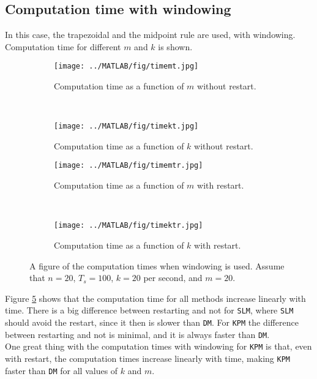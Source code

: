 \subsection{ Computation time with windowing}
In this case, the trapezoidal and the midpoint rule are used, with windowing. Computation time for different $m$ and $k$ is shown.
\begin{figure}[H]
        \centering
        \begin{subfigure}[b]{0.3\textwidth}
                \texttt{[image: ../MATLAB/fig/timemt.jpg]}
                \caption{ Computation time as a function of $m$ without restart. }
                \label{fig:timemt}
        \end{subfigure}
        ~
        \begin{subfigure}[b]{0.3\textwidth}
                \texttt{[image: ../MATLAB/fig/timekt.jpg]}
                \caption{ Computation time as a function of $k$ without restart. }
                \label{fig:timekt}
        \end{subfigure}

        \begin{subfigure}[b]{0.3\textwidth}
                \texttt{[image: ../MATLAB/fig/timemtr.jpg]}
                \caption{ Computation time as a function of $m$ with restart. }
                \label{fig:timemtr}
        \end{subfigure}
        ~
        \begin{subfigure}[b]{0.3\textwidth}
                \texttt{[image: ../MATLAB/fig/timektr.jpg]}
                \caption{ Computation time as a function of $k$ with restart. }
                \label{fig:timektr}
        \end{subfigure}        
        
        \caption{ A figure of the computation times when windowing is used. Assume that $n = 20$, $T_s = 100$, $k = 20$ per second, and $m = 20$. }
        \label{fig:time2}
\end{figure}
\noindent Figure \ref{fig:time2} shows that the computation time for all methods increase linearly with time. There is a big difference between restarting and not for \texttt{SLM}, where \texttt{SLM} should avoid the restart, since it then is slower than \texttt{DM}. For \texttt{KPM} the difference between restarting and not is minimal, and it is always faster than \texttt{DM}. \\

\noindent One great thing with the computation times with windowing for \texttt{KPM} is that, even with restart, the computation times increase linearly with time, making \texttt{KPM} faster than \texttt{DM} for all values of $k$ and $m$.
